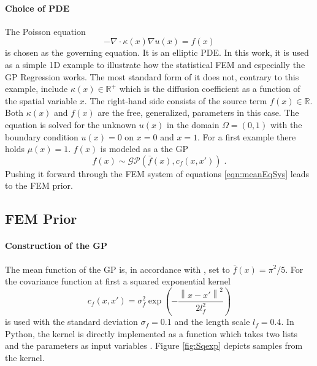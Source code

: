 \documentclass[%
  a4paper,oneside,%
  11pt,%
  smallchapters,
  style=printdev,
  extramargin,
  green,%
  rgb, <cmyk>
  ]{tubsbook}
\begin{document}
\paragraph{Choice of PDE}
The Poisson equation 
\begin{equation}
- \nabla \cdot \kappa(x) \nabla u(x) = f(x)
\label{eqn:Poisson}
\end{equation}
is chosen as the governing equation. It is an elliptic PDE. In this work, it is used as a simple 1D example to illustrate how the statistical FEM and especially the GP Regression works.
The most standard form of it does not, contrary to this example, include $\kappa(x) \in \mathbb{R}^+$ which is the diffusion coefficient as a function of the spatial variable $x$. The right-hand side consists of the source term $f(x)\in \mathbb{R}$. Both $\kappa (x)$ and $f(x)$ are the free, generalized, parameters in this case. The equation is solved for the unknown  $u(x)$ in the domain $\Omega = (0,1)$ with the boundary condition $u(x) = 0$ on $x=0$ and $x=1$.
%
For a first example there holds $\mu(x)=1$. $f(x)$ is modeled as a the GP \cite{girolami2021} 
%
\begin{equation}
f(x) \sim \mathcal{GP} \left( \bar{f}(x), c_f(x,x')\right) \;.
\end{equation}
%
Pushing it forward through the FEM system of equations \eqref{eqn:meanEqSys} leads to the FEM prior.




\subsection{FEM Prior}
\paragraph{Construction of the GP}
The mean function of the GP is, in accordance with \cite{girolami2021}, set to $\bar{f}(x) = \pi^2 / 5$. For the covariance function at first a squared exponential kernel 
%
\begin{equation}
c_f(x,x') =    \sigma_{f}^2 \exp \left(-  \frac{\left \| x-x' \right \|^2}{2l_{f}^2} \right )       
\label{eqn:sqEx_f}
\end{equation}
%
is used with the standard deviation $\sigma_{f} = 0.1$ and the length scale $l_{f} = 0.4$.
In Python, the kernel is directly implemented as a function which takes two lists and the parameters as input variables \cite{murphy2012}. Figure \ref{fig:Sqexp} depicts samples from the kernel.
\end{document}
